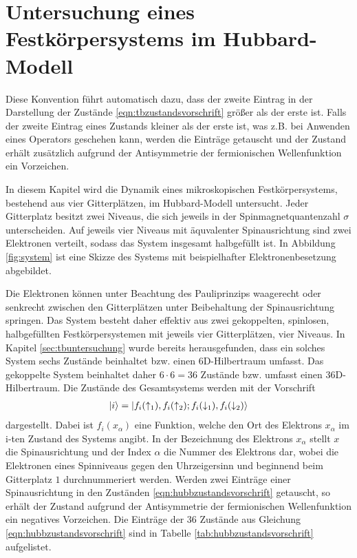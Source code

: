 \section{Untersuchung eines Festkörpersystems im Hubbard-Modell}

Diese Konvention führt automatisch dazu, dass der zweite Eintrag in der Darstellung der Zustände \eqref{eqn:tbzustandsvorschrift} größer als der erste ist.
Falls der zweite Eintrag eines Zustands kleiner als der erste ist, was z.B. bei Anwenden eines Operators geschehen kann, werden die Einträge getauscht und der Zustand erhält zusätzlich aufgrund der Antisymmetrie der fermionischen Wellenfunktion ein Vorzeichen.

In diesem Kapitel wird die Dynamik eines mikroskopischen Festkörpersystems, bestehend aus vier Gitterplätzen, im Hubbard-Modell untersucht.
Jeder Gitterplatz besitzt zwei Niveaus, die sich jeweils in der Spinmagnetquantenzahl $\sigma$ unterscheiden.
Auf jeweils vier Niveaus mit äquvalenter Spinausrichtung sind zwei Elektronen verteilt, sodass das System insgesamt halbgefüllt ist.
In Abbildung \ref{fig:system} ist eine Skizze des Systems mit beispielhafter Elektronenbesetzung abgebildet.

Die Elektronen können unter Beachtung des Pauliprinzips waagerecht oder senkrecht zwischen den Gitterplätzen unter Beibehaltung der Spinausrichtung springen.
Das System besteht daher effektiv aus zwei gekoppelten, spinlosen, halbgefüllten Festkörpersystemen mit jeweils vier Gitterplätzen, vier Niveaus.
In Kapitel \ref{sec:tbuntersuchung} wurde bereits herausgefunden, dass ein solches System sechs Zustände beinhaltet bzw. einen 6D-Hilbertraum umfasst.
Das gekoppelte System beinhaltet daher $6 \cdot 6=36$ Zustände bzw. umfasst einen 36D-Hilbertraum. Die Zustände des Gesamtsystems werden mit der Vorschrift
\begin{align}
  \ket{i} = \ket{f_i(\uparrow_1),f_i(\uparrow_2); f_i(\downarrow_1),f_i(\downarrow_2)}
  \label{eqn:hubbzustandsvorschrift}
\end{align}
dargestellt. Dabei ist $f_i(x_\alpha)$ eine Funktion, welche den Ort des Elektrons $x_\alpha$ im i-ten Zustand des Systems angibt.
In der Bezeichnung des Elektrons $x_\alpha$ stellt $x$ die Spinausrichtung und der Index $\alpha$ die Nummer des Elektrons dar, wobei die Elektronen eines Spinniveaus gegen den Uhrzeigersinn und beginnend beim Gitterplatz $1$ durchnummeriert werden.
Werden zwei Einträge einer Spinausrichtung in den Zuständen \eqref{eqn:hubbzustandsvorschrift} getauscht, so erhält der Zustand aufgrund der Antisymmetrie der fermionischen Wellenfunktion ein negatives Vorzeichen.
Die Einträge der $36$ Zustände aus Gleichung \eqref{eqn:hubbzustandsvorschrift} sind in Tabelle \ref{tab:hubbzustandsvorschrift} aufgelistet.


